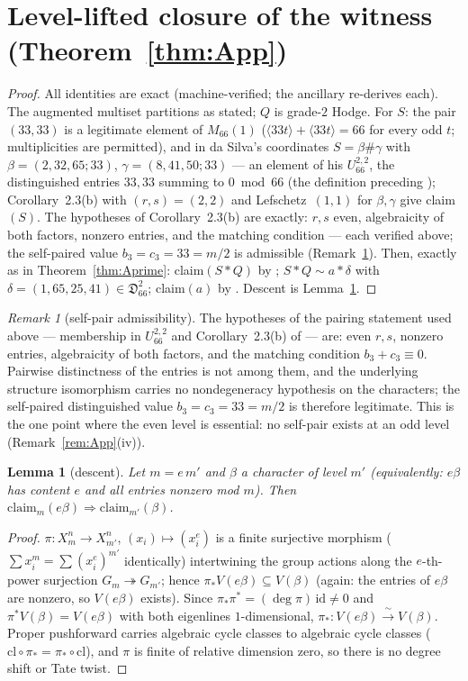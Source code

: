 \documentclass[11pt]{amsart}
\newtheorem{lemma}[theorem]{Lemma}
\theoremstyle{remark}
\newtheorem{remark}[theorem]{Remark}
\newcommand{\Ds}{\mathfrak{D}}
\newcommand{\fr}[1]{\langle #1\rangle}
\newcommand{\V}{V}
\begin{document}
\section{Level-lifted closure of the witness (Theorem~\ref{thm:App})}\label{sec:App}
\begin{proof}
All identities are exact (machine-verified; the ancillary re-derives each). The augmented multiset
partitions as stated; $Q$ is grade-$2$ Hodge. For $S$: the pair $(33,33)$ is a legitimate element of
$M_{66}(1)$ ($\fr{33t}+\fr{33t}=66$ for every odd $t$; multiplicities are permitted), and in da
Silva's coordinates $S=\beta\#\gamma$ with $\beta=(2,32,65;33)$,
$\gamma=(8,41,50;33)$ --- an element of his $U^{2,2}_{66}$, the distinguished entries $33,33$ summing
to $0\bmod66$ (the definition preceding \cite[Cor.~2.3]{daSilva}); Corollary~2.3(b) with $(r,s)=(2,2)$
and Lefschetz~$(1,1)$ for $\beta,\gamma$ give claim$(S)$. The hypotheses of Corollary~2.3(b) are
exactly: $r,s$ even, algebraicity of both factors, nonzero entries, and the matching condition ---
each verified above; the self-paired value $b_3=c_3=33=m/2$ is admissible
(Remark~\ref{rem:selfpair}). Then, exactly as in
Theorem~\ref{thm:Aprime}: claim$(S*Q)$ by \cite[Thm.~1-4(i)]{Aoki87}; $S*Q\sim a*\delta$ with
$\delta=(1,65,25,41)\in\Ds^2_{66}$; claim$(a)$ by \cite[Thm.~1-4(ii)]{Aoki87}. Descent is
Lemma~\ref{lem:descent}.
\end{proof}
\begin{remark}[self-pair admissibility]\label{rem:selfpair}
The hypotheses of the pairing statement used above --- membership in $U^{2,2}_{66}$ and
Corollary~2.3(b) of \cite{daSilva} --- are: even $r,s$, nonzero entries, algebraicity of both
factors, and the matching condition $b_3+c_3\equiv0$. Pairwise distinctness of the entries is
not among them, and the underlying structure isomorphism \cite[Thm.~2.2]{daSilva} carries no
nondegeneracy hypothesis on the characters; the self-paired distinguished value
$b_3=c_3=33=m/2$ is therefore legitimate. This is the one point where the even level is
essential: no self-pair exists at an odd level (Remark~\ref{rem:App}(iv)).
\end{remark}
\begin{lemma}[descent]\label{lem:descent}
Let $m=e\,m'$ and $\beta$ a character of level $m'$ (equivalently: $e\beta$ has content $e$
and all entries nonzero mod $m$). Then
$\mathrm{claim}_m(e\beta)\Rightarrow\mathrm{claim}_{m'}(\beta)$.
\end{lemma}
\begin{proof}
$\pi\colon X^n_m\to X^n_{m'}$, $(x_i)\mapsto(x_i^e)$ is a finite surjective morphism
($\sum x_i^m=\sum(x_i^e)^{m'}$ identically) intertwining the group actions along the $e$-th-power
surjection $G_m\twoheadrightarrow G_{m'}$; hence $\pi_*\V(e\beta)\subseteq\V(\beta)$ (again: the entries of $e\beta$ are nonzero, so $\V(e\beta)$ exists). Since
$\pi_*\pi^*=(\deg\pi)\,\mathrm{id}\neq0$ and $\pi^*\V(\beta)=\V(e\beta)$ with both eigenlines
$1$-dimensional, $\pi_*\colon\V(e\beta)\xrightarrow{\ \sim\ }\V(\beta)$. Proper pushforward carries
algebraic cycle classes to algebraic cycle classes ($\mathrm{cl}\circ\pi_*=\pi_*\circ\mathrm{cl}$),
and $\pi$ is finite of relative dimension zero, so there is no degree shift or Tate twist.
\end{proof}
\end{document}
